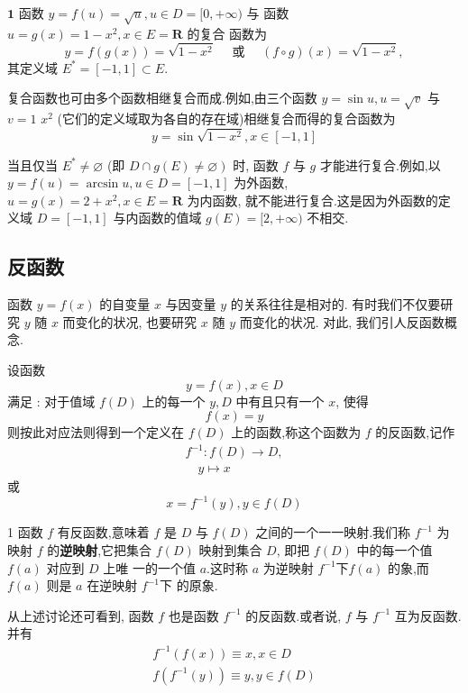 \begin{example}
$\mathbf{1}$ 函数 $y=f(u)=\sqrt{u}, u \in D=[0,+\infty)$ 与 函数 $u=g(x)=1-x^{2}, x \in E=\mathbf{R}$ 的复合 函数为
\[
y=f(g(x))=\sqrt{1-x^{2}} \quad \text { 或 } \quad(f \circ g)(x)=\sqrt{1-x^{2}},
\]
其定义域 $E^{*}=[-1,1] \subset E$.
\end{example}


复合函数也可由多个函数相继复合而成.例如,由三个函数 $y=\sin u, u=\sqrt{v}$ 与 $v=1$ $x^{2}$ (它们的定义域取为各自的存在域)相继复合而得的复合函数为
\[
y=\sin \sqrt{1-x^{2}}, x \in[-1,1]
\]

\begin{remark}
当且仅当 $E^{*} \neq \varnothing$ (即 $\left.D \cap g(E) \neq \varnothing\right)$ 时, 函数 $f$ 与 $g$ 才能进行复合.例如,以 $y=f(u)=\arcsin u, u \in D=[-1,1]$ 为外函数, $u=g(x)=2+x^{2}, x \in E=\mathbf{R}$ 为内函数, 就不能进行复合.这是因为外函数的定义域 $D=[-1,1]$ 与内函数的值域 $g(E)=[2,+\infty)$ 不相交.
\end{remark}


\subsection{反函数}

函数 $y=f(x)$ 的自变量 $x$ 与因变量 $y$ 的关系往往是相对的. 有时我们不仅要研究 $y$ 随 $x$ 而变化的状况, 也要研究 $x$ 随 $y$ 而变化的状况. 对此, 我们引人反函数概念.

设函数
\[
y=f(x), x \in D \tag{3}
\]
满足 : 对于值域 $f(D)$ 上的每一个 $y, D$ 中有且只有一个 $x$, 使得
\[
f(x)=y
\]
则按此对应法则得到一个定义在 $f(D)$ 上的函数,称这个函数为 $f$ 的反函数,记作
\[
\begin{gathered}
	f^{-1}: f(D) \rightarrow D, \\
	\quad y \mapsto x
\end{gathered}
\]
或
\[
x=f^{-1}(y), y \in f(D) \tag{4}
\]

\begin{remark}
	1 函数 $f$ 有反函数,意味着 $f$ 是 $D$ 与 $f(D)$ 之间的一个一一映射.我们称 $f^{-1}$ 为映射 $f$ 的\textbf{逆映射},它把集合 $f(D)$ 映射到集合 $D$, 即把 $f(D)$ 中的每一个值 $f(a)$ 对应到 $D$ 上唯 一的一个值 $a$.这时称 $a$ 为逆映射 $f^{-1} 下 f(a)$ 的象,而 $f(a)$ 则是 $a$ 在逆映射 $f^{-1} 下$ 的原象.

	从上述讨论还可看到, 函数 $f$ 也是函数 $f^{-1}$ 的反函数.或者说, $f$ 与 $f^{-1}$ 互为反函数. 并有
	\[
	\begin{gathered}
		f^{-1}(f(x)) \equiv x, x \in D \\
		f\left(f^{-1}(y)\right) \equiv y, y \in f(D)
	\end{gathered}
	\]
\end{remark}

